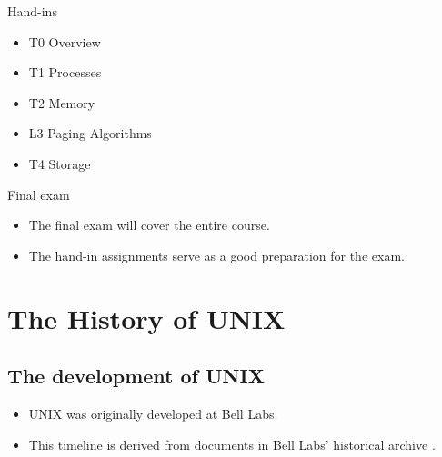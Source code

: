 \documentclass{beamer}
\begin{document}
\begin{frame}{\insertsubsectionhead}{Hand-ins}
  \begin{itemize}
    \item T0 Overview
    \item T1 Processes
    \item T2 Memory
    \item L3 Paging Algorithms
    \item T4 Storage
  \end{itemize}
\end{frame}

\begin{frame}{\insertsubsectionhead}{Final exam}
  \begin{itemize}
    \item The final exam will cover the entire course.
    \item The hand-in assignments serve as a good preparation for the exam.
  \end{itemize}
\end{frame}


\section[History]{The History of UNIX}

\subsection[Development]{The development of UNIX}

\begin{frame}{\insertsubsectionhead}
  \begin{itemize}
    \item UNIX was originally developed at Bell Labs.
    \item This timeline is derived from documents in Bell Labs' historical 
      archive \cite{BellLabs2002tco}.
  \end{itemize}
\end{frame}
\end{document}
